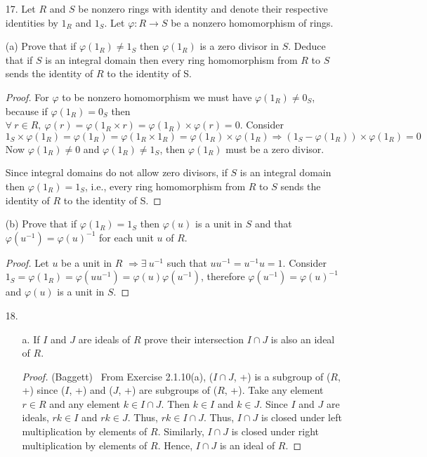 \documentclass[10pt]{article}
\begin{document}
\begin{itemize}
\item[17.]
Let $R$ and $S$ be nonzero rings with identity and denote their respective identities by $1_R$ and $1_S$. Let $\varphi: R \rightarrow S$ be a nonzero homomorphism of rings.

(a) Prove that if $\varphi(1_R) \neq 1_S$ then $\varphi(1_R)$ is a zero divisor in $S$. Deduce that if $S$ is an integral domain then every ring homomorphism from $R$ to $S$ sends the identity of $R$ to the identity of S.

\begin{proof}
For $\varphi$ to be nonzero homomorphism we must have $\varphi(1_R) \neq 0_S$, because if $\varphi(1_R) = 0_S$ then $\forall \ r \in R, \ \varphi(r) = \varphi(1_R \times r)= \varphi(1_R) \times \varphi(r) = 0$. Consider $$1_S \times \varphi(1_R) = \varphi(1_R) =  \varphi(1_R \times 1_R ) = \varphi(1_R) \times \varphi(1_R) \Rightarrow (1_S - \varphi(1_R)) \times \varphi(1_R) = 0$$ Now $\varphi(1_R) \neq 0$ and $\varphi(1_R) \neq 1_S$, then $\varphi(1_R)$ must be a zero divisor.

Since integral domains do not allow zero divisors, if $S$ is an integral domain then $\varphi(1_R) = 1_S$, i.e., every ring homomorphism from $R$ to $S$ sends the identity of $R$ to the identity of S.
\end{proof}

(b) Prove that if $\varphi(1_R) = 1_S$ then $\varphi(u)$ is a unit in $S$ and that $\varphi(u^{-1}) = \varphi(u)^{-1}$ for each unit $u$ of $R$.

\begin{proof}
Let $u$ be a unit in $R$ $\Rightarrow \exists \ u^{-1}$ such that $uu^{-1} = u^{-1}u =1$. Consider
$1_S = \varphi(1_R) = \varphi(uu^{-1}) = \varphi(u)\varphi(u^{-1})$, therefore $\varphi(u^{-1}) = \varphi(u)^{-1}$ and $\varphi(u)$ is a unit in $S$.
\end{proof}


\item[18.] 
\begin{itemize}
\item[a.] If $I$ and $J$ are ideals of $R$ prove their intersection $I \cap J$ is also an ideal of $R$.
\begin{proof}(Baggett) \ From Exercise 2.1.10(a), ($I \cap J$, +) is a subgroup of ($R$, +) since ($I$, +) 
and ($J$, +) are subgroups of ($R$, +). Take any element $r \in R$ and any element $k \in I \cap J$.
Then $k \in I$ and $k \in J$. Since $I$ and $J$ are ideals, $rk \in I$ and $rk \in J$. Thus, $rk \in I \cap J$.
Thus, $I \cap J$ is closed under left multiplication by elements of $R$. Similarly, $I \cap J$ is closed
under right multiplication by elements of $R$. Hence, $I \cap J$ is an ideal of $R$.
\end{proof}


\end{itemize}
\end{itemize}
\end{document}
